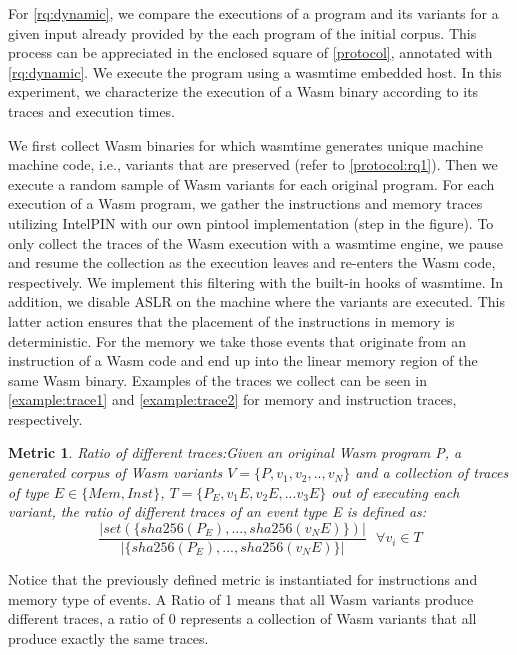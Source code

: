 \documentclass[sigplan,screen]{acmart}
\newcommand{\wasm}{Wasm\xspace}
\newtheorem{metric}{Metric}
\newcommand*\step[1]{
\noindent\tikz[baseline=(char.base)]{
        \node[shape=circle,text=black,draw=black, fill=white,inner sep=1.2pt] (char) {#1};}}
\begin{document}
For \ref{rq:dynamic}, we compare  the executions of a program and its variants for a given input already provided by the each program of the initial corpus.
This process can be appreciated in the enclosed square of \autoref{protocol}, annotated with \ref{rq:dynamic}.
We execute the program using a wasmtime embedded host.
In this experiment, we characterize the  execution of a \wasm binary according to its traces and execution times.

We first collect \wasm binaries for which wasmtime generates unique machine machine code, i.e., variants that are preserved (refer to \autoref{protocol:rq1}).
Then we execute a random sample of \samples \wasm variants for each original program.
For each execution of a \wasm program, we gather the instructions and memory traces utilizing IntelPIN with our own pintool implementation \cite{luk2005pin, 10.1145/3478520} (step \step{4} in the figure).
To only collect the traces of the Wasm execution with a wasmtime engine, we pause and resume the collection as the execution leaves and re-enters the Wasm code, respectively.
We implement this filtering with the built-in hooks of wasmtime.
In addition, we disable ASLR on the machine where the variants are executed.
This latter action ensures that the placement of the instructions in memory is deterministic.
For the memory we take those events that originate from an instruction of a Wasm code and end up into the linear memory region of the same Wasm binary.
Examples of the traces we collect can be seen in \autoref{example:trace1} and \autoref{example:trace2} for memory and instruction traces, respectively.



\begin{metric}{Ratio of different traces:}\label{metric:mem:sha}
Given an original \wasm program P, a generated corpus of \wasm variants $V=\{P,v_1, v_2, .., v_N\}$ and a collection of traces of type $E\in \{Mem, Inst\}$, $T=\{P_E, v_1E, v_2E, ...v_3E\}$ out of executing each variant, the ratio of different traces of an event type E is defined as:
$$
    \frac{| set(\{ sha256({P_E}),..., sha256(v_NE) \})|}{| \{ sha256(P_E),..., sha256(v_NE) \}|}\text{ } \forall v_i \in T
$$

\end{metric}

Notice that the previously defined metric is instantiated for instructions and memory type of events.
A Ratio of 1 means that all \wasm variants produce different traces, a ratio of 0 represents a collection of \wasm variants that all produce exactly the same traces.
\end{document}
